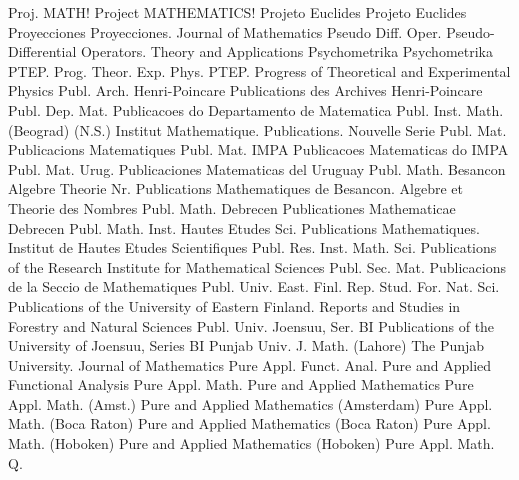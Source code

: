{Proj. MATH!}
{Project MATHEMATICS!}
{Projeto Euclides}
{Projeto Euclides}
{Proyecciones}
{Proyecciones. Journal of Mathematics}
{Pseudo Diff. Oper.}
{Pseudo-Differential Operators. Theory and Applications}
{Psychometrika}
{Psychometrika}
{PTEP. Prog. Theor. Exp. Phys.}
{PTEP. Progress of Theoretical and Experimental Physics}
{Publ. Arch. Henri-Poincare}
{Publications des Archives Henri-Poincare}
{Publ. Dep. Mat.}
{Publicacoes do Departamento de Matematica}
{Publ. Inst. Math. (Beograd) (N.S.)}
{Institut Mathematique. Publications. Nouvelle Serie}
{Publ. Mat.}
{Publicacions Matematiques}
{Publ. Mat. IMPA}
{Publicacoes Matematicas do IMPA}
{Publ. Mat. Urug.}
{Publicaciones Matematicas del Uruguay}
{Publ. Math. Besancon Algebre Theorie Nr.}
{Publications Mathematiques de Besancon. Algebre et Theorie des Nombres}
{Publ. Math. Debrecen}
{Publicationes Mathematicae Debrecen}
{Publ. Math. Inst. Hautes Etudes Sci.}
{Publications Mathematiques. Institut de Hautes Etudes Scientifiques}
{Publ. Res. Inst. Math. Sci.}
{Publications of the Research Institute for Mathematical Sciences}
{Publ. Sec. Mat.}
{Publicacions de la Seccio de Mathematiques}
{Publ. Univ. East. Finl. Rep. Stud. For. Nat. Sci.}
{Publications of the University of Eastern Finland. Reports and Studies in Forestry and Natural Sciences}
{Publ. Univ. Joensuu, Ser. BI}
{Publications of the University of Joensuu, Series BI}
{Punjab Univ. J. Math. (Lahore)}
{The Punjab University. Journal of Mathematics}
{Pure Appl. Funct. Anal.}
{Pure and Applied Functional Analysis}
{Pure Appl. Math.}
{Pure and Applied Mathematics}
{Pure Appl. Math. (Amst.)}
{Pure and Applied Mathematics (Amsterdam)}
{Pure Appl. Math. (Boca Raton)}
{Pure and Applied Mathematics (Boca Raton)}
{Pure Appl. Math. (Hoboken)}
{Pure and Applied Mathematics (Hoboken)}
{Pure Appl. Math. Q.}
